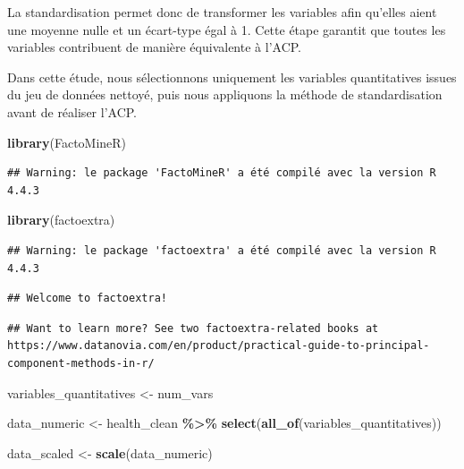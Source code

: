 \documentclass[
]{article}
\newenvironment{Shaded}{\begin{snugshade}}{\end{snugshade}}
\newcommand{\FunctionTok}[1]{\textcolor[rgb]{0.13,0.29,0.53}{\textbf{#1}}}
\newcommand{\NormalTok}[1]{#1}
\newcommand{\OtherTok}[1]{\textcolor[rgb]{0.56,0.35,0.01}{#1}}
\newcommand{\SpecialCharTok}[1]{\textcolor[rgb]{0.81,0.36,0.00}{\textbf{#1}}}
\begin{document}
La standardisation permet donc de transformer les variables afin
qu'elles aient une moyenne nulle et un écart-type égal à 1. Cette étape
garantit que toutes les variables contribuent de manière équivalente à
l'ACP.

Dans cette étude, nous sélectionnons uniquement les variables
quantitatives issues du jeu de données nettoyé, puis nous appliquons la
méthode de standardisation avant de réaliser l'ACP.

\begin{Shaded}
\begin{Highlighting}[]
\FunctionTok{library}\NormalTok{(FactoMineR)}
\end{Highlighting}
\end{Shaded}

\begin{verbatim}
## Warning: le package 'FactoMineR' a été compilé avec la version R 4.4.3
\end{verbatim}

\begin{Shaded}
\begin{Highlighting}[]
\FunctionTok{library}\NormalTok{(factoextra)}
\end{Highlighting}
\end{Shaded}

\begin{verbatim}
## Warning: le package 'factoextra' a été compilé avec la version R 4.4.3
\end{verbatim}

\begin{verbatim}
## Welcome to factoextra!
\end{verbatim}

\begin{verbatim}
## Want to learn more? See two factoextra-related books at https://www.datanovia.com/en/product/practical-guide-to-principal-component-methods-in-r/
\end{verbatim}

\begin{Shaded}
\begin{Highlighting}[]
\NormalTok{variables\_quantitatives }\OtherTok{\textless{}{-}}\NormalTok{ num\_vars}

\NormalTok{data\_numeric }\OtherTok{\textless{}{-}}\NormalTok{ health\_clean }\SpecialCharTok{\%\textgreater{}\%} \FunctionTok{select}\NormalTok{(}\FunctionTok{all\_of}\NormalTok{(variables\_quantitatives))}

\NormalTok{data\_scaled }\OtherTok{\textless{}{-}} \FunctionTok{scale}\NormalTok{(data\_numeric)}
\end{Highlighting}
\end{Shaded}
\end{document}
